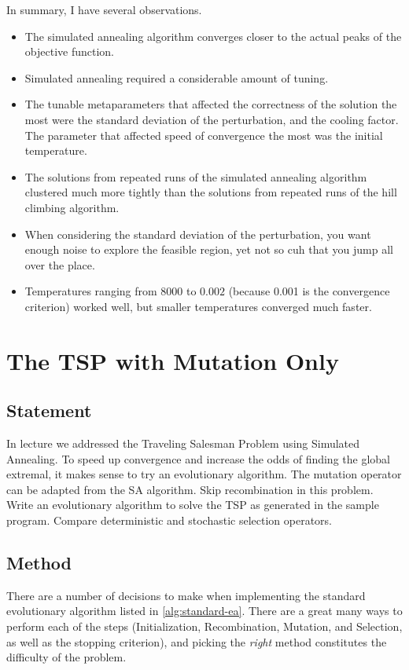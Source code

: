 \documentclass{article}
\begin{document}
In summary, I have several observations.
\begin{itemize}
    \item The simulated annealing algorithm converges closer to the actual peaks of the objective
          function.
    \item Simulated annealing required a considerable amount of tuning.
    \item The tunable metaparameters that affected the correctness of the solution the most were
          the standard deviation of the perturbation, and the cooling factor. The parameter that
          affected speed of convergence the most was the initial temperature.
    \item The solutions from repeated runs of the simulated annealing algorithm clustered much more
          tightly than the solutions from repeated runs of the hill climbing algorithm.
    \item When considering the standard deviation of the perturbation, you want enough noise to
          explore the feasible region, yet not so cuh that you jump all over the place.
    \item Temperatures ranging from $8000$ to $0.002$ (because 0.001 is the convergence criterion)
          worked well, but smaller temperatures converged much faster.
\end{itemize}


\section{The TSP with Mutation Only}\label{prob:2}

\subsection{Statement}
In lecture we addressed the Traveling Salesman Problem using Simulated Annealing. To speed up
convergence and increase the odds of finding the global extremal, it makes sense to try an
evolutionary algorithm. The mutation operator can be adapted from the SA algorithm. Skip
recombination in this problem. Write an evolutionary algorithm to solve the TSP as generated in the
sample program. Compare deterministic and stochastic selection operators.

\subsection{Method}
There are a number of decisions to make when implementing the standard evolutionary algorithm
listed in \autoref{alg:standard-ea}. There are a great many ways to perform each of the steps
(Initialization, Recombination, Mutation, and Selection, as well as the stopping criterion), and
picking the \textit{right} method constitutes the difficulty of the problem.
\end{document}
